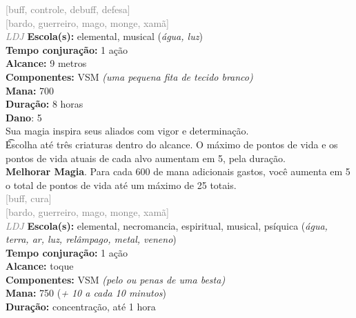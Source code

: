 \documentclass{RPG_Adventure}[2021/10/20]
\begin{document}
{\scriptsize \textcolor{gray}{[buff, controle, debuff, defesa]\\}}
{\scriptsize \textcolor{gray}{[bardo, guerreiro, mago, monge, xamã]\\}}
{\tiny \textcolor{gray}{\textit{LDJ}}}\jump{}
{\small \t \textbf{Escola(s):} elemental, musical (\textit{água, luz})\\\t \textbf{Tempo conjuração:} 1 ação\\\t \textbf{Alcance:} 9 metros\\\t \textbf{Componentes:} VSM \textit{(uma pequena fita de tecido branco)}\\\t \textbf{Mana:} 700\\\t \textbf{Duração:} 8 horas\\\t \textbf{Dano}: 5\\}
{\normalsize Sua magia inspira seus aliados com vigor e determinação.\\\t Escolha até três criaturas dentro do alcance. O máximo de pontos de vida e os pontos de vida atuais de cada alvo aumentam em 5, pela duração.\\\t \textbf{Melhorar Magia}. Para cada 600 de mana adicionais gastos, você aumenta em 5 o total de pontos de vida até um máximo de 25 totais.\\}
{\scriptsize \textcolor{gray}{[buff, cura]\\}}
{\scriptsize \textcolor{gray}{[bardo, guerreiro, mago, monge, xamã]\\}}
{\tiny \textcolor{gray}{\textit{LDJ}}}\jump{}
{\small \t \textbf{Escola(s):} elemental, necromancia, espiritual, musical, psíquica (\textit{água, terra, ar, luz, relâmpago, metal, veneno})\\\t \textbf{Tempo conjuração:} 1 ação\\\t \textbf{Alcance:} toque\\\t \textbf{Componentes:} VSM \textit{(pelo ou penas de uma besta)}\\\t \textbf{Mana:} 750 (\textit{+ 10 a cada 10 minutos})\\\t \textbf{Duração:} concentração, até 1 hora\\}
\end{document}
